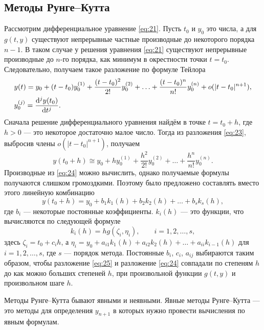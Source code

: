 \documentclass[a4paper,12pt]{article}
\newcommand{\dd}{\mathrm{d}}
\begin{document}
	\subsection{Методы Рунге--Кутта}

	Рассмотрим дифференциальное уравнение \eqref{eq:21}. Пусть \(t_0\) и \(y_0\) это
	числа, а для \(g(t,y)\) существуют непрерывные частные производные до некоторого
	порядка \(n-1\). В таком случае у решения уравнения \eqref{eq:21} существуют
	непрерывные производные до \(n\)-го порядка, как минимум в окрестности точки
	\(t=t_0\). Следовательно, получаем такое разложение по формуле Тейлора
	\begin{equation}\label{eq:23}
		\begin{lgathered}
			y(t)=y_0+(t-t_0)y_0^{(1)}+\frac{(t-t_0)^2}{2!}y_0^{(2)}+\ldots+\frac{(t-t_0)^n}{n!}y_0^{(n)}+o(|t-t_0|^{n+1}),\\
			y_0^{(j)}=\frac{\dd^j y(t_0)}{\dd t^j}.
		\end{lgathered}
	\end{equation}
	Сначала решение дифференциального уравнения найдём в точке \(t=t_0+h\), где
	\(h>0\) --- это некоторое достаточно малое число.
	Тогда из разложения \eqref{eq:23}, выбросив члены \(o(|t-t_0|^{n+1})\), получаем
	\begin{equation}\label{eq:24}
		y(t_0+h)\cong y_0+hy_0^{(1)}+\frac{h^2}{2!}y_0^{(2)}+\ldots+\frac{h^n}{n!}y_0^{(n)}.
	\end{equation}
	Производные из \eqref{eq:24} можно вычислить, однако получаемые формулы получаются слишком громоздкими. Поэтому было предложено составлять вместо этого линейную комбинацию
	\begin{equation}\label{eq:25}
		y(t_0+h)= y_0+b_1k_1(h)+b_2k_2(h)+\ldots+b_sk_s(h),
	\end{equation}
	где \(b_i\) --- некоторые постоянные коэффициенты. \(k_i(h)\) --- это функции, что вычисляются по следующей формуле
	 \begin{equation}\label{eq:26}
		k_i(h)=hg(\zeta_i,\eta_i),\qquad i=1,2,\ldots,s,
	\end{equation}
	здесь \(\zeta_i=t_0+c_ih\), а
	\(\eta_i=y_0+a_{i1}k_1(h)+a_{i2}k_2(h)+\ldots+a_{ii}k_{i-1}(h)\) для
	\(i=1,2,\ldots,s\), где \(s\) --- порядок метода. Постоянные \(b_i\), \(c_i\), \(a_{ij}\) выбираются таким образом, чтобы разложение \eqref{eq:25} и разложение \eqref{eq:24} совпадали по степеням \(h\) до как можно больших степеней \(h\), при произвольной функции \(g(t,y)\) и произвольном шаге \(h\).
	
Методы Рунге--Кутта бывают явными и неявными. Явные методы Рунге--Кутта --- это методы для определения \(y_{n+1}\) в которых нужно провести вычисления по явным формулам.
\end{document}
